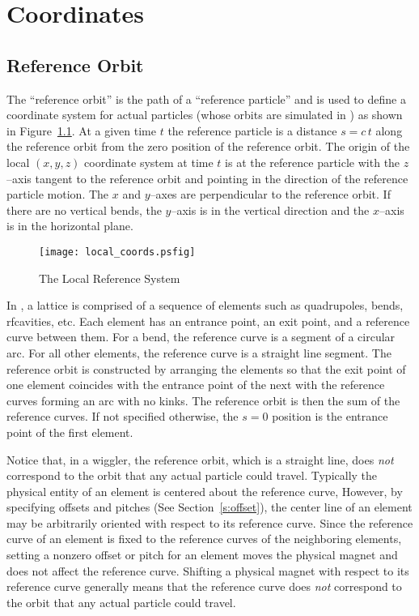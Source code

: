 \chapter{Coordinates}

\section{Reference Orbit}
\label{s:ref}

The ``reference orbit'' is the path of a ``reference particle'' and is
used to define a coordinate system for actual particles (whose orbits
are simulated in \bmad) as shown in Figure~\ref{f:local_coords}. At a
given time $t$ the reference particle is a distance $s = c \, t$ along
the reference orbit from the zero position of the reference orbit. The
origin of the local $(x, y, z)$ coordinate system at time $t$ is at the
reference particle with the $z$--axis tangent to the reference
orbit and pointing in the direction of the reference particle
motion. The $x$ and $y$--axes are perpendicular to the reference
orbit. If there are no vertical bends, the $y$--axis is in the
vertical direction and the $x$--axis is in the horizontal plane.

\begin{figure}[tb]
\centering
\texttt{[image: local\_coords.psfig]}
\caption{The Local Reference System}
\label{f:local_coords}
\end{figure}

In \bmad, a lattice is comprised of a sequence of elements such as
quadrupoles, bends, rfcavities, etc. Each element has an entrance
point, an exit point, and a reference curve between them. For a bend,
the reference curve is a segment of a circular arc. For all other
elements, the reference curve is a straight line segment.  The
reference orbit is constructed by arranging the elements so that the
exit point of one element coincides with the entrance point of the
next with the reference curves forming an arc with no kinks.
The reference orbit is then the sum of the reference curves. If
not specified otherwise, the $s = 0$ position is the entrance
point of the first element.

Notice that, in a wiggler, the reference orbit, which is a straight
line, does {\em not} correspond to the orbit that any actual particle
could travel. Typically the physical entity of an element is centered
about the reference curve, However, by specifying offsets and pitches
(See Section~\ref{s:offset}), the center line of an element may be
arbitrarily oriented with respect to its reference curve. Since the
reference curve of an element is fixed to the reference curves of the
neighboring elements, setting a nonzero offset or pitch
for an element moves the physical magnet and does not affect the
reference curve. Shifting a physical magnet with respect to its
reference curve generally means that the reference curve does {\em
not} correspond to the orbit that any actual particle could travel.

